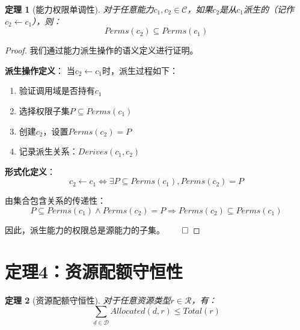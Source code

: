 \documentclass{article}
\newtheorem{theorem}{定理}[section]
\theoremstyle{definition}
\theoremstyle{remark}
\begin{document}
\begin{theorem}[能力权限单调性]
    对于任意能力$c_1, c_2 \in \mathcal{C}$，如果$c_2$是从$c_1$派生的（记作$c_2 \leftarrow c_1$），则：
    \[
    Perms(c_2) \subseteq Perms(c_1)
    \]
\end{theorem}

\begin{proof}
    我们通过能力派生操作的语义定义进行证明。

    \textbf{派生操作定义}：
    当$c_2 \leftarrow c_1$时，派生过程如下：
    \begin{enumerate}
        \item 验证调用域是否持有$c_1$
        \item 选择权限子集$P \subseteq Perms(c_1)$
        \item 创建$c_2$，设置$Perms(c_2) = P$
        \item 记录派生关系：$Derives(c_1, c_2)$
    \end{enumerate}

    \textbf{形式化定义}：
    \[
    c_2 \leftarrow c_1 \iff \exists P \subseteq Perms(c_1), Perms(c_2) = P
    \]

    由集合包含关系的传递性：
    \[
    P \subseteq Perms(c_1) \land Perms(c_2) = P \Rightarrow Perms(c_2) \subseteq Perms(c_1)
    \]

    因此，派生能力的权限总是源能力的子集。$\qed$
\end{proof}

\section{定理4：资源配额守恒性}

\begin{theorem}[资源配额守恒性]
    对于任意资源类型$r \in \mathcal{R}$，有：
    \[
    \sum_{d \in \mathcal{D}} Allocated(d, r) \leq Total(r)
    \]
\end{theorem}
\end{document}
